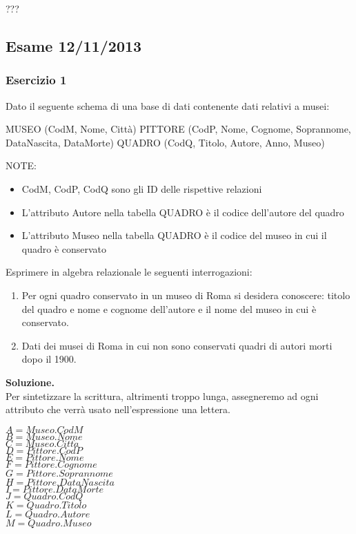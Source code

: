 ???


\newpage
\subsection{Esame 12/11/2013}
  \subsubsection{Esercizio 1}
  Dato il seguente schema di una base di dati contenente dati relativi a musei:
  \begin{center}
    MUSEO (CodM, Nome, Città)
    PITTORE (CodP, Nome, Cognome, Soprannome, DataNascita, DataMorte)
    QUADRO (CodQ, Titolo, Autore, Anno, Museo)
  \end{center}
  NOTE: 
  \begin{itemize}
   \item CodM, CodP, CodQ sono gli ID delle rispettive relazioni
   \item L'attributo Autore nella tabella QUADRO è il codice dell'autore del quadro
   \item L'attributo Museo nella tabella QUADRO è il codice del museo in cui il quadro è conservato
  \end{itemize}
 Esprimere in algebra relazionale le seguenti interrogazioni:
 \begin{enumerate}
  \item Per ogni quadro conservato in un museo di Roma si desidera conoscere: titolo del quadro 
  e nome e cognome dell’autore e il nome del museo in cui è conservato.
  \item Dati dei musei di Roma in cui non sono conservati quadri di autori morti dopo il 1900.
 \end{enumerate}

  \noindent\textbf{\fontsize{14pt}{1em}Soluzione.}\\
  Per sintetizzare la scrittura, altrimenti troppo lunga, assegneremo ad ogni attributo che verrà usato
  nell'espressione una lettera.
  
  \begin{multicols}{3}
  \begin{flushleft}
   $A = Museo.CodM$\\
   $B = Museo.Nome$\\
   $C = Museo.Citt\grave{a}$\\
   $D = Pittore.CodP$\\
   $E = Pittore.Nome$\\
   $F = Pittore.Cognome$\\
   $G = Pittore.Soprannome$\\
   $H = Pittore.DataNascita$\\
   $I = Pittore.DataMorte$\\
   $J = Quadro.CodQ$\\
   $K = Quadro.Titolo$\\
   $L = Quadro.Autore$\\
   $M = Quadro.Museo$\\
  \end{flushleft}
  \end{multicols}

